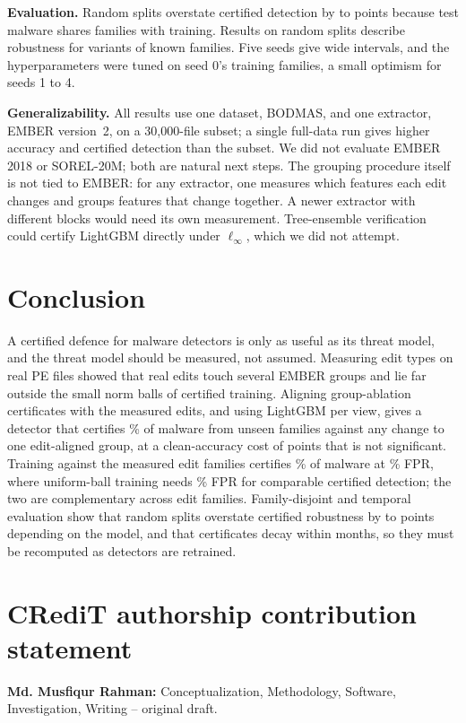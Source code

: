\documentclass[preprint,12pt,authoryear]{elsarticle}
\begin{document}
\textbf{Evaluation.} Random splits overstate certified detection by \RandFamGapMin{} to \RandFamGapMax{} points because test malware shares families with training. Results on random splits describe robustness for variants of known families. Five seeds give wide intervals, and the hyperparameters were tuned on seed 0's training families, a small optimism for seeds 1 to 4.

\textbf{Generalizability.} All results use one dataset, BODMAS, and one extractor, EMBER version~2, on a 30,000-file subset; a single full-data run gives higher accuracy and certified detection than the subset. We did not evaluate EMBER 2018 or SOREL-20M; both are natural next steps. The grouping procedure itself is not tied to EMBER: for any extractor, one measures which features each edit changes and groups features that change together. A newer extractor with different blocks would need its own measurement. Tree-ensemble verification \citep{kantchelian2016evasion,chen2019robustness} could certify LightGBM directly under $\ell_\infty$, which we did not attempt.

\FloatBarrier
\section{Conclusion}
A certified defence for malware detectors is only as useful as its threat model, and the threat model should be measured, not assumed. Measuring \PsNEditTypesInScope{} edit types on real PE files showed that real edits touch several EMBER groups and lie far outside the small norm balls of certified training. Aligning group-ablation certificates with the measured edits, and using LightGBM per view, gives a detector that certifies \FamCertROneLgbmViews\% of malware from unseen families against any change to one edit-aligned group, at a clean-accuracy cost of \CmpFAbs{} points that is not significant. Training against the measured edit families certifies \SwEditCert\% of malware at \SwEditFpr\% FPR, where uniform-ball training needs \SwUnifOneFpr\% FPR for comparable certified detection; the two are complementary across edit families. Family-disjoint and temporal evaluation show that random splits overstate certified robustness by \RandFamGapMin{} to \RandFamGapMax{} points depending on the model, and that certificates decay within months, so they must be recomputed as detectors are retrained.

\FloatBarrier
\section*{CRediT authorship contribution statement}
\textbf{Md. Musfiqur Rahman:} Conceptualization, Methodology, Software, Investigation, Writing -- original draft.
\end{document}
